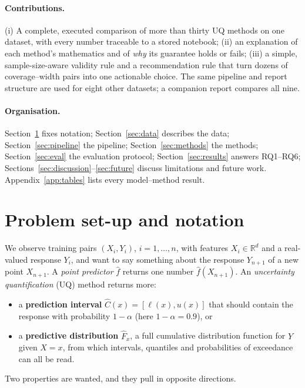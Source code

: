 \documentclass[11pt]{article}
\begin{document}
\paragraph{Contributions.} (i) A complete, executed comparison of more than thirty UQ methods on one dataset, with every number traceable
to a stored notebook; (ii) an explanation of each method's mathematics and of \emph{why} its guarantee holds or fails; (iii) a simple,
sample-size-aware validity rule and a recommendation rule that turn dozens of coverage--width pairs into one actionable choice.
The same pipeline and report structure are used for eight other datasets; a companion report compares all nine.

\paragraph{Organisation.} Section~\ref{sec:setup} fixes notation; Section~\ref{sec:data} describes the data; Section~\ref{sec:pipeline} the
pipeline; Section~\ref{sec:methods} the methods; Section~\ref{sec:eval} the evaluation protocol; Section~\ref{sec:results} answers RQ1--RQ6;
Sections~\ref{sec:discussion}--\ref{sec:future} discuss limitations and future work. Appendix~\ref{app:tables} lists every model--method result.

\section{Problem set-up and notation}\label{sec:setup}
We observe training pairs $(X_i,Y_i)$, $i=1,\dots,n$, with features $X_i\in\mathbb R^d$ and a real-valued response
$Y_i$, and want to say something about the response $Y_{n+1}$ of a new point $X_{n+1}$. A \emph{point predictor}
$\hat f$ returns one number $\hat f(X_{n+1})$. An \emph{uncertainty quantification} (UQ) method returns more:
\begin{itemize}
\item a \textbf{prediction interval} $\hat C(x)=[\ell(x),u(x)]$ that should contain the response with probability
$1-\alpha$ (here $1-\alpha=0.9$), or
\item a \textbf{predictive distribution} $\hat F_x$, a full cumulative distribution function for $Y$ given $X=x$, from which
intervals, quantiles and probabilities of exceedance can all be read.
\end{itemize}
Two properties are wanted, and they pull in opposite directions.
\end{document}
